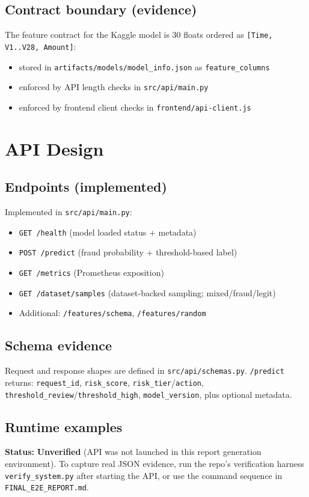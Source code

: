 \documentclass[11pt]{article}
\newcommand{\code}[1]{\texttt{#1}}
\newcommand{\statusunverified}{\textbf{Unverified}}
\begin{document}
\subsection{Contract boundary (evidence)}
The feature contract for the Kaggle model is 30 floats ordered as \code{[Time, V1..V28, Amount]}:
\begin{itemize}
  \item stored in \code{artifacts/models/model_info.json} as \code{feature_columns}
  \item enforced by API length checks in \code{src/api/main.py}
  \item enforced by frontend client checks in \code{frontend/api-client.js}
\end{itemize}

\section{API Design}
\subsection{Endpoints (implemented)}
Implemented in \code{src/api/main.py}:
\begin{itemize}
  \item \code{GET /health} (model loaded status + metadata)
  \item \code{POST /predict} (fraud probability + threshold-based label)
  \item \code{GET /metrics} (Prometheus exposition)
  \item \code{GET /dataset/samples} (dataset-backed sampling; mixed/fraud/legit)
  \item Additional: \code{/features/schema}, \code{/features/random}
\end{itemize}

\subsection{Schema evidence}
Request and response shapes are defined in \code{src/api/schemas.py}. \code{/predict} returns:
\code{request_id}, \code{risk_score}, \code{risk_tier}/\code{action}, \code{threshold_review}/\code{threshold_high}, \code{model_version}, plus optional metadata.

\subsection{Runtime examples}
\textbf{Status:} \statusunverified{} (API was not launched in this report generation environment).  
To capture real JSON evidence, run the repo's verification harness \code{verify_system.py} after starting the API, or use the command sequence in \code{FINAL_E2E_REPORT.md}.
\end{document}
